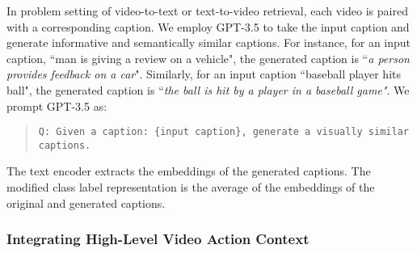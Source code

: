 \documentclass{article} \usepackage{iclr2024_conference,times}
\begin{document}
In problem setting of video-to-text or text-to-video retrieval, each video is paired with a corresponding caption. We employ GPT-3.5 to take the input caption and generate informative and semantically similar captions. For instance, for an input caption, ``man is giving a review on a vehicle", the generated caption is ``\emph{a person provides feedback on a car}". Similarly, for an input caption ``baseball player hits ball", the generated caption is ``\emph{the ball is hit by a player in a baseball game"}. We prompt GPT-3.5 as:
     \begin{quotation}
\centering \begin{minipage}{0.9\linewidth} {\texttt{Q: Given a caption: {\{input caption}\}, generate a visually similar captions.}} 


\end{minipage}
\end{quotation}

The text encoder  extracts the embeddings of the generated captions. The modified class label representation   is the average of the embeddings of the original and generated captions.



\subsubsection{Integrating High-Level Video Action Context} 
\label{subsubsec: Integrating High-Level Video Action Context}
\end{document}
